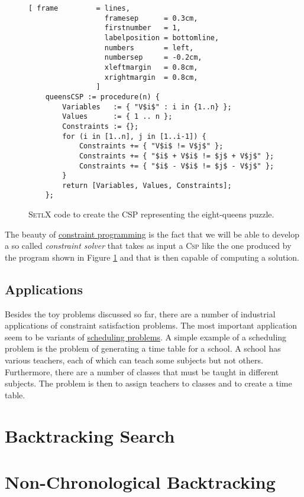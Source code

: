 \begin{figure}[!ht]
\centering
\begin{Verbatim}[ frame         = lines, 
                  framesep      = 0.3cm, 
                  firstnumber   = 1,
                  labelposition = bottomline,
                  numbers       = left,
                  numbersep     = -0.2cm,
                  xleftmargin   = 0.8cm,
                  xrightmargin  = 0.8cm,
                ]
    queensCSP := procedure(n) {
        Variables   := { "V$i$" : i in {1..n} };
        Values      := { 1 .. n };
        Constraints := {};
        for (i in [1..n], j in [1..i-1]) {
            Constraints += { "V$i$ != V$j$" };
            Constraints += { "$i$ + V$i$ != $j$ + V$j$" };
            Constraints += { "$i$ - V$i$ != $j$ - V$j$" };
        }
        return [Variables, Values, Constraints];
    };
\end{Verbatim}
\vspace*{-0.3cm}
\caption{\textsc{SetlX} code to create the CSP representing the eight-queens puzzle.}
\label{fig:queens-csp.stlx}
\end{figure}
The beauty of \href{https://en.wikipedia.org/wiki/Constraint_programming}{constraint programming} is the fact
that we will be able to develop a so called \emph{\color{blue}constraint solver} that takes as input a \textsc{Csp}
like the one produced by the program shown in Figure \ref{fig:queens-csp.stlx} and that is then capable of
computing a solution. 

\subsection{Applications}
Besides the toy problems discussed so far, there are a number of industrial applications of constraint
satisfaction problems.  The most important application seem to be variants of
\href{https://en.wikipedia.org/wiki/Scheduling_(production_processes)}{scheduling problems}. 
A simple example of a scheduling problem is the problem of generating a time table for a school.  A school has
various teachers, each of which can teach some subjects but not others.  Furthermore, there are a number of
classes that must be taught in different subjects.  The problem is then to assign teachers to classes and to
create a time table.

\section{Backtracking Search}
\section{Non-Chronological Backtracking}
